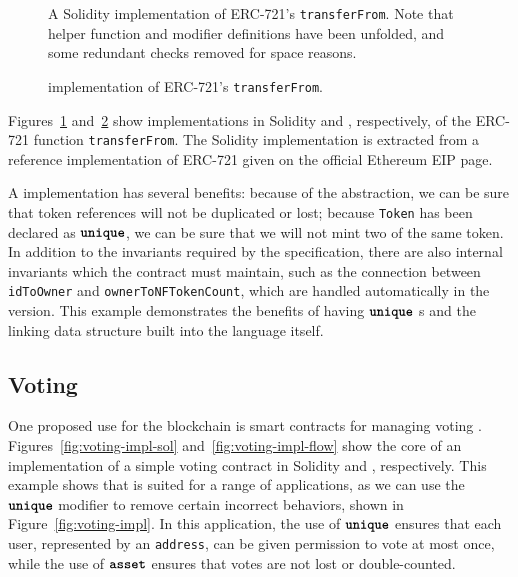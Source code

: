 \documentclass[dvipsnames, usenames, sigconf]{acmart}
\begin{document}
\begin{figure*}[h]
    \centering
    \begin{subfigure}[t]{0.49\textwidth}
        \centering
        
        \caption{A Solidity implementation of ERC-721's \lstinline{transferFrom}.
            Note that helper function and modifier definitions have been unfolded, and some redundant checks removed for space reasons.}
        \label{fig:erc721-impl-sol}
    \end{subfigure}%
    \hfill
    \begin{subfigure}[t]{0.49\textwidth}
        \centering
        
        \caption{\langName implementation of ERC-721's \lstinline{transferFrom}.}
        \label{fig:erc721-impl-flow}
    \end{subfigure}
    \label{fig:erc721-impl}
\end{figure*}

Figures~\ref{fig:erc721-impl-sol} and~\ref{fig:erc721-impl-flow} show implementations in Solidity and \langName, respectively, of the ERC-721 function \lstinline{transferFrom}.
The Solidity implementation is extracted from a reference implementation of ERC-721 given on the official Ethereum EIP page.

A \langName implementation has several benefits: because of the \assetTxt abstraction, we can be sure that token references will not be duplicated or lost; because \lstinline{Token} has been declared as $\textbf{\texttt{unique}}$, we can be sure that we will not mint two of the same token.
In addition to the invariants required by the specification, there are also internal invariants which the contract must maintain, such as the connection between \lstinline{idToOwner} and \lstinline{ownerToNFTokenCount}, which are handled automatically in the \langName version.
This example demonstrates the benefits of having $\textbf{\texttt{unique}}$ \assetTxt{}s and the linking data structure built into the language itself.

\subsection{Voting}
One proposed use for the blockchain is smart contracts for managing voting .
Figures~\ref{fig:voting-impl-sol} and~\ref{fig:voting-impl-flow} show the core of an implementation of a simple voting contract in Solidity and \langName, respectively.
This example shows that \langName is suited for a range of applications, as we can use the $\textbf{\texttt{unique}}$ modifier to remove certain incorrect behaviors, shown in Figure~\ref{fig:voting-impl}.
In this application, the use of $\textbf{\texttt{unique}}$ ensures that each user, represented by an \lstinline{address}, can be given permission to vote at most once, while the use of $\textbf{\texttt{asset}}$ ensures that votes are not lost or double-counted.
\end{document}
